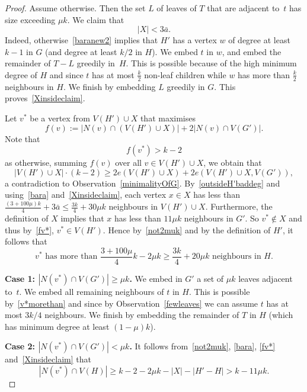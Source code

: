 \documentclass[12pt]{article}
\begin{document}
        \begin{proof}
        Assume otherwise. Then the set $L$ of leaves of $T$ that are adjacent to~$t$ has size exceeding $\mu k$. We claim that   
        \begin{equation}\label{Xinsideclaim}
            |X|< 3\bar a.
        \end{equation} Indeed, otherwise~\eqref{baranew2} implies that $H'$ has a vertex $w$ of   degree at least $k-1$ in $G$ (and degree at least $k/2$ in $H$). We embed $t$ in $w$, and embed the remainder of $T-L$   greedily in~$H$. 
    This is possible because of the high minimum degree of $H$ and  since $t$ has at most $\frac{k}{2}$ non-leaf children    while $w$ has more than $\frac{k}{2}$ neighbours in $H$. We finish by embedding $L$ greedily in $G$. This proves~\eqref{Xinsideclaim}.
    
    Let $v^*$ be  
         a vertex from $V(H')\cup X$ that maximises $$f(v):=|N(v) \cap (V(H')\cup X)|+2|N(v)\cap V(G')|.$$ Note that  
            \begin{equation}\label{fv*}
        f(v^*)>k-2
           \end{equation}
         as otherwise, summing $f(v)$ over all $v\in V(H')\cup X$, we obtain that 
          $$
          |V(H')\cup X|\cdot (k-2) \ge 2e(V(H')\cup X) + 2e(V(H')\cup X,V(G')),
          $$
          a contradiction to Observation~\ref{minimalityOfG}. 
         By~\eqref{outsideH'baddeg} and using~\eqref{bara} and~\eqref{Xinsideclaim}, each vertex $x\in X$ has less than  $\frac{(3+100\mu)k}{4}+3\bar a \le \frac{3k}{4}+ 30\mu k$ neighbours in $V(H')\cup X$. Furthermore, the definition of $X$ implies that $x$ has less than $11\mu k$ neighbours in $G'$. So $v^*\notin X$ and thus by~\eqref{fv*},
         $v^*\in V(H')$. Hence by~\eqref{not2muk} and by the definition of $H'$, it follows that 
         \begin{equation}\label{v*morethan}
     \text{$v^*$ has  more than $\frac{3+100\mu}{4} k-2\mu k\ge \frac{3k}{4}+20\mu k$ 
neighbours in~$H$.}
\end{equation}

{\bf Case 1: $|N(v^*)\cap V(G')|\ge \mu k$.} We  embed in $G'$ a set of  $\mu k$ leaves adjacent to~$t$. 
We  embed all remaining neighbours of $t$ in $H$. This is possible by~\eqref{v*morethan} and since by Observation~\ref{fewleaves} we can assume $t$ has at most  $3k/4$ neighbours. 
We finish by embedding the remainder of $T$ in $H$ (which has minimum degree at least $(1-\mu)k$). 

{\bf Case 2:  $|N(v^*)\cap V(G')|< \mu k$.}  It follows from~\eqref{not2muk}, \eqref{bara}, \eqref{fv*} and~\eqref{Xinsideclaim} that  
 \begin{equation}\label{nbsofv*inHin2ndcase}
 \text{$|N(v^*)\cap V(H)|\ge k-2-2\mu k-|X|-|H'-H| %
 >k-11\mu k$.}
 \end{equation}
 


\end{proof}
\end{document}
